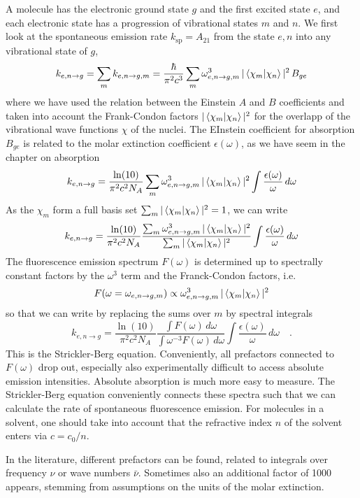 A molecule has the electronic ground state $g$ and the first excited state $e$, and each electronic state has a progression of vibrational states $m$ and $n$. We first look at the spontaneous emission rate  $k_{\text{sp}} =  A_{21}$
from the state $e,n$ into any vibrational state of $g$, 
%
\[
k_{e,n \rightarrow g}  = \sum_m  k_{e,n \rightarrow g,m}  = \frac{\hbar}{\pi^2 c^3} \sum_m  \omega_{e,n \rightarrow g,m}^3 \,  | \braket{\chi_m |  \chi_n} |^2 \, B_{ge} 
\]
where we have used the relation between the Einstein $A$ and $B$ coefficients and taken into account the Frank-Condon factors $ | \braket {\chi_m | \chi_n} |^2 $ for the overlapp of the vibrational wave functions $\chi$ of the nuclei.
%
The EInstein coefficient for absorption $B_{ge} $ is related to the molar extinction coefficient $\epsilon(\omega)$, as we have seem in the chapter on absorption
\[
 k_{e,n \rightarrow g}  = \frac{\ln(10)}{\pi^2 c^2 N_A} \sum_m  \omega_{e,n \rightarrow g,m}^3 \,  | \braket{\chi_m |  \chi_n} |^2
 \int \frac{\epsilon(\omega)}{\omega} \, d \omega
\]
%
As the  $\chi_m$ form a full basis set $\sum_m  | \braket {\chi_m | \chi_n} |^2 = 1$,  we can write
\[
 k_{e,n \rightarrow g}  = \frac{\ln(10)}{\pi^2 c^2 N_A} 
%
\frac{ 
 \sum_m  \omega_{e,n \rightarrow g,m}^3 \,  | \braket{\chi_m |  \chi_n} |^2 }
 { \sum_m  | \braket {\chi_m | \chi_n} |^2 }
 \int \frac{\epsilon(\omega)}{\omega} \, d \omega
\]
The fluorescence emission spectrum $F(\omega)$ is determined up to spectrally constant factors by the $\omega^3$ term and the Franck-Condon factors, i.e.
\[
 F(\omega =  \omega_{e,n \rightarrow g,m} )  \propto  \omega_{e,n \rightarrow g,m}^3 \,  | \braket{\chi_m |  \chi_n} |^2 
\]
so that we can write by replacing the sums over $m$ by  spectral integrals
\[
 k_{e,n \rightarrow g}  =  \frac{\ln(10)}{\pi^2 c^2 N_A} \frac{\int F(\omega) \, d \omega}{\int \omega^{-3} F(\omega) \, d \omega }
 \int \frac{\epsilon(\omega)}{\omega} \, d \omega   \quad. 
\]
This is the Strickler-Berg equation. Conveniently, all prefactors connected to $F(\omega)$ drop out, especially also experimentally difficult to access absolute emission intensities. Absolute absorption is much more easy to measure. The Strickler-Berg equation conveniently connects these spectra such that we can calculate the rate of spontaneous fluorescence emission. For molecules in a solvent, one should take into account that the refractive index $n$ of the solvent enters via $c = c_0 / n$. 

In the literature, different prefactors can be found, related to integrals over frequency $\nu$ or wave numbers $\bar{\nu}$. Sometimes also an additional factor of 1000 appears, stemming from assumptions on the units of the molar extinction.














